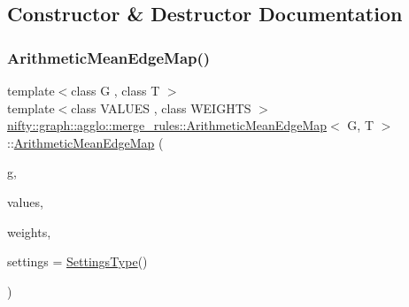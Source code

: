 \subsection{Constructor \& Destructor Documentation}
\mbox{\label{classnifty_1_1graph_1_1agglo_1_1merge__rules_1_1ArithmeticMeanEdgeMap_ae92e301804e5bf9b875517f97e225d5d}} 
\subsubsection{\texorpdfstring{Arithmetic\+Mean\+Edge\+Map()}{ArithmeticMeanEdgeMap()}}
{\footnotesize\ttfamily template$<$class G , class T $>$ \\
template$<$class V\+A\+L\+U\+ES , class W\+E\+I\+G\+H\+TS $>$ \\
\hyperlink{classnifty_1_1graph_1_1agglo_1_1merge__rules_1_1ArithmeticMeanEdgeMap}{nifty\+::graph\+::agglo\+::merge\+\_\+rules\+::\+Arithmetic\+Mean\+Edge\+Map}$<$ G, T $>$\+::\hyperlink{classnifty_1_1graph_1_1agglo_1_1merge__rules_1_1ArithmeticMeanEdgeMap}{Arithmetic\+Mean\+Edge\+Map} (\begin{DoxyParamCaption}\item[{const \hyperlink{classnifty_1_1graph_1_1agglo_1_1merge__rules_1_1ArithmeticMeanEdgeMap_a920251c7296554c793d991a09938cc0f}{Graph\+Type} \&}]{g,  }\item[{const V\+A\+L\+U\+ES \&}]{values,  }\item[{const W\+E\+I\+G\+H\+TS \&}]{weights,  }\item[{const \hyperlink{classnifty_1_1graph_1_1agglo_1_1merge__rules_1_1ArithmeticMeanEdgeMap_a356668f9c14aae4ff88d90a232923766}{Settings\+Type} \&}]{settings = {\ttfamily \hyperlink{classnifty_1_1graph_1_1agglo_1_1merge__rules_1_1ArithmeticMeanEdgeMap_a356668f9c14aae4ff88d90a232923766}{Settings\+Type}()} }\end{DoxyParamCaption})\hspace{0.3cm}{\ttfamily [inline]}}



